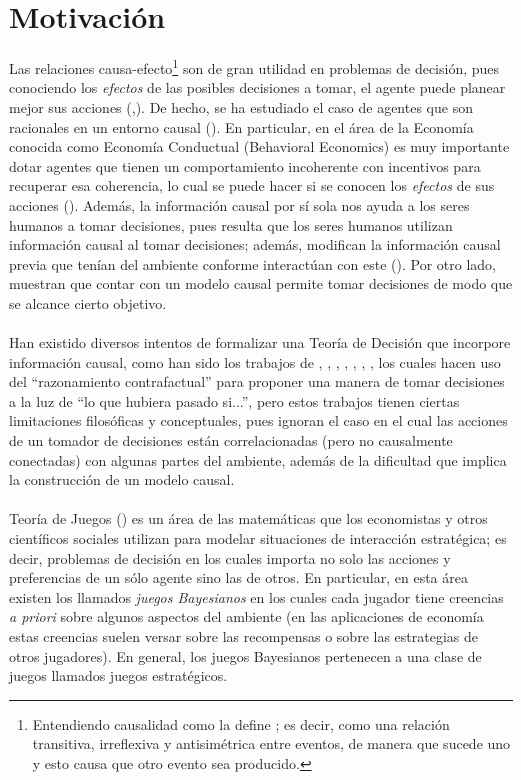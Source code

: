 \documentclass[11pt]{article}
\theoremstyle{plain}
\begin{document}
\section{Motivación}
Las relaciones causa-efecto\footnote{Entendiendo causalidad como la define \cite{spirtes2000causation}; es decir, como una relación transitiva, irreflexiva y antisimétrica entre eventos, de manera que sucede uno y esto causa que otro evento sea producido.} son de gran utilidad en problemas de decisión, pues conociendo los \textit{efectos} de las posibles decisiones a tomar, el agente puede planear mejor sus acciones (\cite{hagmayer2013repeated},\cite{pearlwhy}). De hecho, se ha estudiado el caso de agentes que son racionales en un entorno causal (\cite{board2006equivalence}). En particular, en el área de la Economía conocida como Economía Conductual (Behavioral Economics) es muy importante dotar agentes que tienen un comportamiento incoherente con incentivos para recuperar esa coherencia, lo cual se puede hacer si se conocen los \textit{efectos} de sus acciones (\cite{kleinberg2014time}). Además, la información causal por sí sola nos ayuda a los seres humanos a tomar decisiones, pues resulta que los seres humanos utilizan información causal al tomar decisiones; además, modifican la información causal previa que tenían del ambiente conforme interactúan con este (\cite{hagmayer2013repeated}). Por otro lado, \cite{lattimoreNIPS2016} muestran que contar con un modelo causal permite tomar decisiones de modo que se alcance cierto objetivo.\\
\\
Han existido diversos intentos de formalizar una Teoría de Decisión que incorpore información causal, como han sido los trabajos de \cite{joyce1999foundations}, \cite{board2006equivalence}, \cite{joyce2012regret}, \cite{ahmed2012push}, \cite{rottman2014reasoning}, \cite{soares2015toward}, \cite{stalnaker2016knowledge}, los cuales hacen uso del “razonamiento contrafactual” para proponer una manera de tomar decisiones a la luz de “lo que hubiera pasado si...”, pero estos trabajos tienen ciertas limitaciones filosóficas y conceptuales, pues ignoran el caso en el cual las acciones de un tomador de decisiones están correlacionadas (pero no causalmente conectadas) con algunas partes del ambiente, además de la dificultad que implica la construcción de un modelo causal. \\
\\
Teoría de Juegos (\cite{osborne1994course}) es un área de las matemáticas que los economistas y otros científicos sociales utilizan para modelar situaciones de interacción estratégica; es decir, problemas de decisión en los cuales importa no solo las acciones y preferencias de un sólo agente sino las de otros. En particular, en esta área existen los llamados \textit{juegos Bayesianos} en los cuales cada jugador tiene creencias \textit{a priori} sobre algunos aspectos del ambiente (en las aplicaciones de economía estas creencias suelen versar sobre las recompensas o sobre las estrategias de otros jugadores). En general, los juegos Bayesianos pertenecen a una clase de juegos llamados juegos estratégicos.\\
\end{document}
